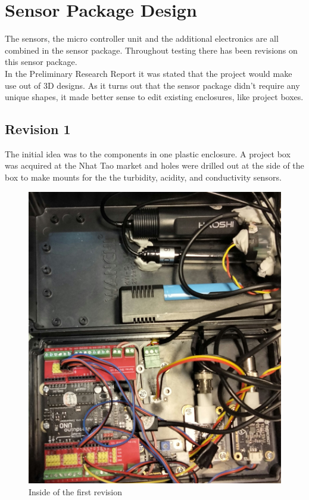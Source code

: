 \newpage
\section{Sensor Package Design}
The sensors, the micro controller unit and the additional electronics are all combined in the sensor package. Throughout testing there has been revisions on this sensor package.\\

In the Preliminary Research Report it was stated that the project would make use out of 3D designs. As it turns out that the sensor package didn't require any unique shapes, it made better sense to edit existing enclosures, like project boxes.

\subsection{Revision 1}
The initial idea was to the components in one plastic enclosure. A project box was acquired at the Nhat Tao market and holes were drilled out at the side of the box to make mounts for the the turbidity, acidity, and conductivity sensors.

\begin{figure}[h]
\centering
\includegraphics[scale=0.1]{51_rev1.jpg}
\caption{Inside of the first revision}
\end{figure}

